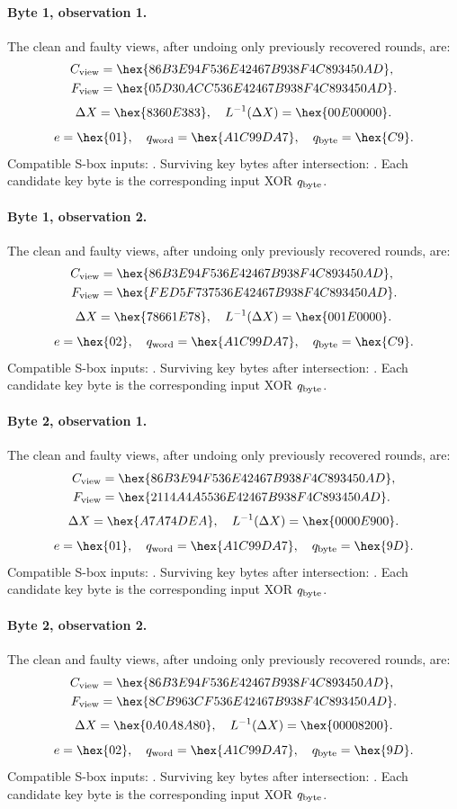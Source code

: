\paragraph{Byte 1, observation 1.}
The clean and faulty views, after undoing only previously recovered rounds, are:
\[\begin{aligned}C_{\rm view}&=\hex{86B3E94F536E42467B938F4C893450AD},\\F_{\rm view}&=\hex{05D30ACC536E42467B938F4C893450AD}.\end{aligned}\]
\[\Delta X=\hex{8360E383},\quad L^{-1}(\Delta X)=\hex{00E00000}.\]
\[e=\hex{01},\quad q_{\rm word}=\hex{A1C99DA7},\quad q_{\rm byte}=\hex{C9}.\]
Compatible S-box inputs: . Surviving key bytes after intersection: . Each candidate key byte is the corresponding input XOR $q_{\rm byte}$.
\paragraph{Byte 1, observation 2.}
The clean and faulty views, after undoing only previously recovered rounds, are:
\[\begin{aligned}C_{\rm view}&=\hex{86B3E94F536E42467B938F4C893450AD},\\F_{\rm view}&=\hex{FED5F737536E42467B938F4C893450AD}.\end{aligned}\]
\[\Delta X=\hex{78661E78},\quad L^{-1}(\Delta X)=\hex{001E0000}.\]
\[e=\hex{02},\quad q_{\rm word}=\hex{A1C99DA7},\quad q_{\rm byte}=\hex{C9}.\]
Compatible S-box inputs: . Surviving key bytes after intersection: . Each candidate key byte is the corresponding input XOR $q_{\rm byte}$.
\paragraph{Byte 2, observation 1.}
The clean and faulty views, after undoing only previously recovered rounds, are:
\[\begin{aligned}C_{\rm view}&=\hex{86B3E94F536E42467B938F4C893450AD},\\F_{\rm view}&=\hex{2114A4A5536E42467B938F4C893450AD}.\end{aligned}\]
\[\Delta X=\hex{A7A74DEA},\quad L^{-1}(\Delta X)=\hex{0000E900}.\]
\[e=\hex{01},\quad q_{\rm word}=\hex{A1C99DA7},\quad q_{\rm byte}=\hex{9D}.\]
Compatible S-box inputs: . Surviving key bytes after intersection: . Each candidate key byte is the corresponding input XOR $q_{\rm byte}$.
\paragraph{Byte 2, observation 2.}
The clean and faulty views, after undoing only previously recovered rounds, are:
\[\begin{aligned}C_{\rm view}&=\hex{86B3E94F536E42467B938F4C893450AD},\\F_{\rm view}&=\hex{8CB963CF536E42467B938F4C893450AD}.\end{aligned}\]
\[\Delta X=\hex{0A0A8A80},\quad L^{-1}(\Delta X)=\hex{00008200}.\]
\[e=\hex{02},\quad q_{\rm word}=\hex{A1C99DA7},\quad q_{\rm byte}=\hex{9D}.\]
Compatible S-box inputs: . Surviving key bytes after intersection: . Each candidate key byte is the corresponding input XOR $q_{\rm byte}$.
